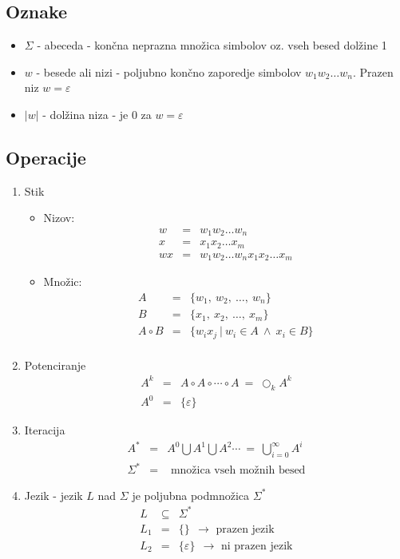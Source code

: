 \documentclass[10pt,a4paper]{article}
\begin{document}
\subsection*{Oznake}
	\begin{itemize}
		\item $\Sigma$ - abeceda - končna neprazna množica simbolov oz. vseh besed dolžine 1
		\item $w$ - besede ali nizi - poljubno končno zaporedje  simbolov $w_1w_2 \ldots w_n$. Prazen niz $w = \varepsilon$
		\item $|w|$ - dolžina niza - je $0$ za $w = \varepsilon$
	\end{itemize}
\subsection*{Operacije}
	\begin{enumerate}
		\item Stik
			\begin{itemize}
				\item Nizov: 
					\begin{eqnarray*} 
						w & = & w_1 w_2 \ldots w_n \\ 
						x & = & x_1 x_2 \ldots x_m \\ 
						wx & = & w_1 w_2 \ldots w_n x_1 x_2 \ldots x_m
					\end{eqnarray*} 
				\item Množic:
					\begin{eqnarray*} 
						A & = & \lbrace w_1 ,\ w_2 ,\ \ldots ,\ w_n \rbrace \\ 
						B & = & \lbrace x_1 ,\ x_2 ,\ \ldots ,\ x_m \rbrace \\ 
						A \circ B & = & \lbrace w_ix_j \ | \ w_i \in A \ \wedge \ x_i \in B \rbrace \\
					\end{eqnarray*} 

			\end{itemize}
		\item Potenciranje
			\begin{eqnarray*} 
				A^k & = & A \circ A \circ \cdots \circ A \ = \ \bigcirc_{k} A^k \\
				A^0 & = & \lbrace \varepsilon \rbrace 
			\end{eqnarray*} 		
		\item Iteracija
			\begin{eqnarray*} 
				A^* & = & A^0 \bigcup A^1 \bigcup A^2 \cdots  \ = \ \bigcup_{i=0}^{ \infty } A^i \\
				\Sigma^* & = & \mbox{ množica vseh možnih besed}
			\end{eqnarray*} 		
		\item Jezik - jezik $L$ nad $ \Sigma $ je poljubna podmnožica $ \Sigma^* $ 
			\begin{eqnarray*} 
				L & \subseteq & \Sigma^* \\
				L_1 & = & \lbrace \rbrace \ \ \rightarrow \mbox{ prazen jezik} \\
				L_2 & = & \lbrace \varepsilon \rbrace  \ \ \rightarrow \mbox{ ni prazen jezik} 
			\end{eqnarray*} 
	\end{enumerate}
\end{document}
